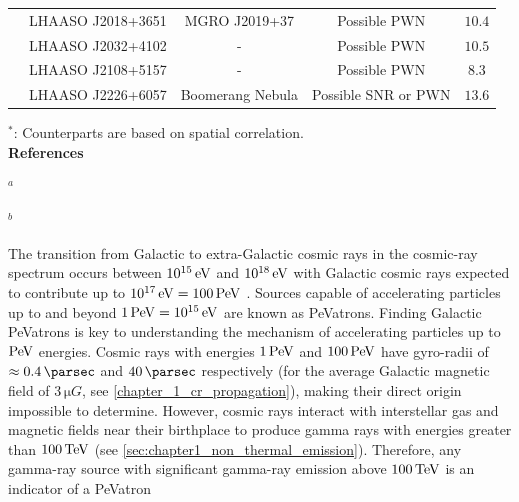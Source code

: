 \begin{table}[b!]
{\begin{threeparttable}
\begin{tabular}{ccccc}
         & LHAASO J2018+3651 & MGRO J2019+37  & Possible PWN & $10.4$ \\
         & LHAASO J2032+4102 & - & Possible PWN & $10.5$ \\
         & LHAASO J2108+5157 & - & Possible PWN & $8.3$ \\
         & LHAASO J2226+6057 & Boomerang Nebula & Possible SNR or PWN & $13.6$ \\
         \hline
    \end{tabular}
    \begin{tablenotes}
	\item $^*$: Counterparts are based on spatial correlation.  \\
	\textbf{References}
	\item $^{a}$ \cite{2018APS..APRB17003B} 
	\item $^{b}$ \cite{2015MNRAS.449.3827K} 
    \end{tablenotes}
    \end{threeparttable}
    }
\end{table}
The transition from Galactic to extra-Galactic cosmic rays in the cosmic-ray spectrum occurs between $10^{15}\,\si{\electronvolt}$ and $10^{18}\,\si{\electronvolt}$ with Galactic cosmic rays expected to contribute up to $10^{17}\,\eV=100\,\PeV$ \citep{2016A&A...595A..33T}. Sources capable of accelerating particles up to and beyond $1\,\PeV=10^{15}\,\eV$ are known as PeVatrons. Finding Galactic PeVatrons is key to understanding the mechanism of accelerating particles up to $\PeV$ energies.
\newpar
Cosmic rays with energies $1\,\PeV$ and $100\,\PeV$ have gyro-radii of $\approx 0.4\,\pc$ and $40\,\pc$ respectively (for the average Galactic magnetic field of $3\,\si{\micro G}$, see \autoref{chapter_1_cr_propagation}), making their direct origin impossible to determine. However, cosmic rays interact with interstellar gas and magnetic fields near their birthplace to produce gamma rays with energies greater than $100\,\TeV$ (see \autoref{sec:chapter1_non_thermal_emission}). Therefore, any gamma-ray source with significant gamma-ray emission above $100\,\TeV$ is an indicator of a PeVatron
\newpar 
